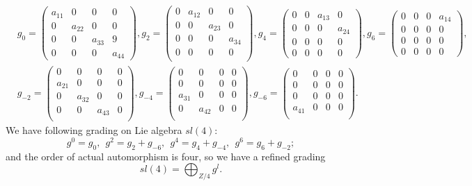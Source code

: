 \documentclass[a4paper,11pt]{article}
\begin{document}
\begin{align}
&g_{0}=\left(\begin{array}{cccc}
a_{11}&0&0&0\\
0&a_{22} & 0&0\\
0&0&a_{33}&9\\
0&0&0&a_{44}
\end{array}\right),
g_{2}=\left(\begin{array}{cccc}
0&a_{12}&0&0\\
0&0&a_{23}&0 \\
0&0&0&a_{34} \\
0&0&0&0 \\
\end{array}\right), 
g_{4}=\left(\begin{array}{cccc}
0&0&a_{13}&0\\
0&0 & 0&a_{24}\\
0&0&0&0 \\
0&0&0&0
\end{array}\right), 
g_{6}=\left(\begin{array}{cccc}
0&0&0&a_{14}\\
0&0 & 0&0\\
0&0&0&0 \\
0&0&0&0
\end{array}\right), \nonumber\\
&g_{-2}=\left(\begin{array}{cccc}
0&0&0&0\\
a_{21}&0&0&0 \\
0&a_{32}&0&0 \\
0&0&a_{43}&0 \\
\end{array}\right), 
g_{-4}=\left(\begin{array}{cccc}
0&0&0&0\\
0&0&0&0 \\
a_{31}&0&0&0 \\
0&a_{42}&0&0 \\
\end{array}\right), 
g_{-6}=\left(\begin{array}{cccc}
0&0&0&0\\
0&0&0&0 \\
0&0&0&0 \\
a_{41}&0&0&0 \\
\end{array}\right).
\end{align}
We have following grading on Lie algebra $sl(4)$:
\begin{equation}
g^{0}=g_0,~~g^2=g_{2}+g_{-6},~~g^4=g_{4}+g_{-4},~~g^6=g_{6}+g_{-2};
\end{equation}
and the order of actual automorphism is four, so we have a 
refined grading 
\begin{equation}
sl(4)=\bigoplus_{Z/4} g^l.
\end{equation}
\end{document}
